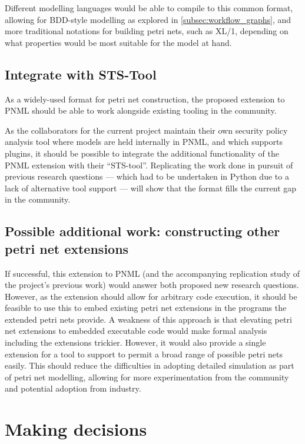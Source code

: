 \documentclass[11pt]{article}
\begin{document}
Different modelling languages would be able to compile to this common format,
allowing for BDD-style modelling as explored in \cref{subsec:workflow_graphs},
and more traditional notations for building petri nets, such as XL/1\cite{xl1},
depending on what properties would be most suitable for the model at hand.


\subsection{Integrate with STS-Tool}
\label{sec:orgbaaa2ff}
As a widely-used format for petri net construction, the proposed extension to
PNML should be able to work alongside existing tooling in the community.

As the collaborators for the current project maintain their own security policy
analysis tool where models are held internally in PNML, and which supports
plugins, it should be possible to integrate the additional functionality of the
PNML extension with their ``STS-tool''\cite{mattia_sts}. Replicating the work
done in pursuit of previous research questions --- which had to be undertaken in
Python due to a lack of alternative tool support --- will show that the format
fills the current gap in the community.

\subsection{Possible additional work: constructing other petri net extensions}
\label{sec:orgb1ca444}
If successful, this extension to PNML (and the accompanying replication study of
the project's previous work) would answer both proposed new research questions.
However, as the extension should allow for arbitrary code execution, it should
be feasible to use this to embed existing petri net extensions in the programs
the extended petri nets provide. A weakness of this approach is that elevating
petri net extensions to embedded executable code would make formal analysis
including the extensions trickier. However, it would also provide a single
extension for a tool to support to permit a broad range of possible petri nets
easily. This should reduce the difficulties in adopting detailed simulation as
part of petri net modelling, allowing for more experimentation from the
community and potential adoption from industry.


\section{Making decisions}
\label{sec:org1ba7164}
\end{document}
